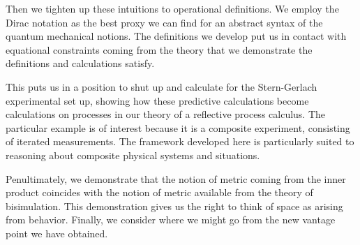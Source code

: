 Then we tighten up these intuitions to operational definitions. We
employ the Dirac notation as the best proxy we can find for an
abstract syntax of the quantum mechanical notions. The definitions we
develop put us in contact with equational constraints coming from the
theory that we demonstrate the definitions and calculations satisfy.

This puts us in a position to shut up and calculate for the
Stern-Gerlach experimental set up, showing how these predictive
calculations become calculations on processes in our theory of a
reflective process calculus. The particular example is of interest
because it is a composite experiment, consisting of iterated
measurements. The framework developed here is particularly suited to
reasoning about composite physical systems and situations.

Penultimately, we demonstrate that the notion of metric coming from
the inner product coincides with the notion of metric available from
the theory of bisimulation. This demonstration gives us the right to
think of space as arising from behavior. Finally, we consider where we
might go from the new vantage point we have obtained.

